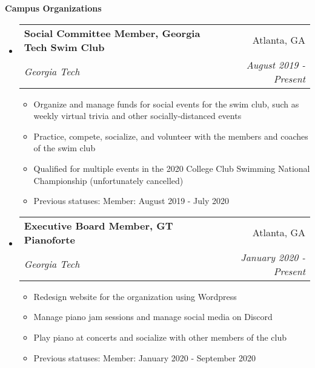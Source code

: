\documentclass[letterpaper,10pt]{article}
\makeatletter
\newcommand{\resitem}[1]{\item #1 \vspace{-2pt}}
\newcommand{\resheading}[1]{{\large \colorbox{mygrey}{\begin{minipage}{\textwidth}{\textbf{#1 \vphantom{p\^{E}}}}\end{minipage}}}}
\newcommand{\ressubheading}[4]{
\begin{tabular*}{7.0in}{l@{\extracolsep{\fill}}r}
		\textbf{#1} & #2 \\
		\textit{#3} & \textit{#4} \\
\end{tabular*}\vspace{-6pt}}
\makeatother
\begin{document}
\resheading{Campus Organizations}
\begin{itemize}
\item
    \ressubheading{Social Committee Member, Georgia Tech Swim Club}{Atlanta, GA}{Georgia Tech}{August 2019 - Present}
    \begin{itemize}
        \resitem{Organize and manage funds for social events for the swim club, such as weekly virtual trivia and other socially-distanced events}
        \resitem{Practice, compete, socialize, and volunteer with the members and coaches of the swim club}
        \resitem{Qualified for multiple events in the 2020 College Club Swimming National Championship (unfortunately cancelled)}
        \resitem{Previous statuses: Member: August 2019 - July 2020}
    \end{itemize}
\item
    \ressubheading{Executive Board Member, GT Pianoforte}{Atlanta, GA}{Georgia Tech}{January 2020 - Present}
    \begin{itemize}
        \resitem{Redesign website for the organization using Wordpress}
        \resitem{Manage piano jam sessions and manage social media on Discord}
        \resitem{Play piano at concerts and socialize with other members of the club}
        \resitem{Previous statuses: Member: January 2020 - September 2020}
    \end{itemize}
\end{itemize}
\end{document}

